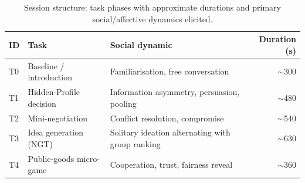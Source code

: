 
\begin{table}[t]
  \centering
  \caption{Session structure: task phases with approximate durations and
    primary social/affective dynamics elicited.}
  \label{tab:tasks}
  \small
  \begin{tabular}{llp{4cm}r}
    \toprule
    \textbf{ID} & \textbf{Task} & \textbf{Social dynamic} & \textbf{Duration (s)} \\
    \midrule
    T0 & Baseline / introduction       & Familiarisation, free conversation              & $\sim$300 \\
    T1 & Hidden-Profile decision       & Information asymmetry, persuasion, pooling      & $\sim$480 \\
    T2 & Mini-negotiation              & Conflict resolution, compromise                 & $\sim$540 \\
    T3 & Idea generation (NGT)         & Solitary ideation alternating with group ranking & $\sim$630 \\
    T4 & Public-goods micro-game       & Cooperation, trust, fairness reveal             & $\sim$360 \\
    \bottomrule
  \end{tabular}
\end{table}
